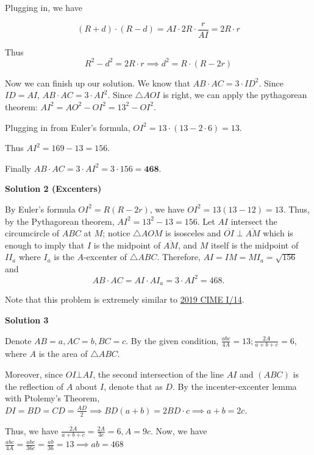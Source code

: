 \begin{enumerate}
 Plugging in, we have 

 
 \[(R+d)\cdot (R-d) = AI \cdot 2R \cdot \frac{r}{AI} = 2R \cdot r\]

 Thus 
 \[R^2-d^2 = 2R \cdot r \implies d^2 = R \cdot (R-2r)\]

 


 
Now we can finish up our solution. We know that $AB \cdot AC = 3 \cdot ID^2$. Since $ID = AI$, $AB \cdot AC = 3 \cdot AI^2$. Since $\triangle AOI$ is right, we can apply the pythagorean theorem: $AI^2 = AO^2-OI^2 = 13^2-OI^2$.

 Plugging in from Euler's formula, $OI^2 = 13 \cdot (13 - 2 \cdot 6) = 13$.

 Thus $AI^2 = 169-13 = 156$.

 Finally $AB \cdot AC = 3 \cdot AI^2 = 3 \cdot 156 = \textbf{468}$.

 



\textbf{Solution 2 (Excenters)}

By Euler's formula $OI^{2}=R(R-2r)$, we have $OI^{2}=13(13-12)=13$. Thus, by the Pythagorean theorem, $AI^{2}=13^{2}-13=156$. Let $AI$ intersect the circumcircle of $ABC$ at $M$; notice $\triangle AOM$ is isosceles and $\overline{OI}\perp\overline{AM}$ which is enough to imply that $I$ is the midpoint of $\overline{AM}$, and $M$ itself is the midpoint of $II_{a}$ where $I_{a}$ is the $A$-excenter of $\triangle ABC$. Therefore, $AI=IM=MI_{a}=\sqrt{156}$ and 
 \[AB\cdot AC=AI\cdot AI_{a}=3\cdot AI^{2}=\boxed{468}.\]

 Note that this problem is extremely similar to \href{https://artofproblemsolving.com/wiki/index.php?title=2019\_CIME\_I\_Problems/Problem\_14}{2019 CIME I/14}.

 



\textbf{Solution 3}

Denote $AB=a, AC=b, BC=c$. By the given condition, $\frac{abc}{4A}=13; \frac{2A}{a+b+c}=6$, where $A$ is the area of $\triangle{ABC}$.

 Moreover, since $OI\bot AI$, the second intersection of the line $AI$ and $(ABC)$ is the reflection of $A$ about $I$, denote that as $D$. By the incenter-excenter lemma with Ptolemy's Theorem, $DI=BD=CD=\frac{AD}{2}\implies BD(a+b)=2BD\cdot c\implies a+b=2c$.

 Thus, we have $\frac{2A}{a+b+c}=\frac{2A}{3c}=6, A=9c$. Now, we have $\frac{abc}{4A}=\frac{abc}{36c}=\frac{ab}{36}=13\implies ab=\boxed{468}$





\end{enumerate}
